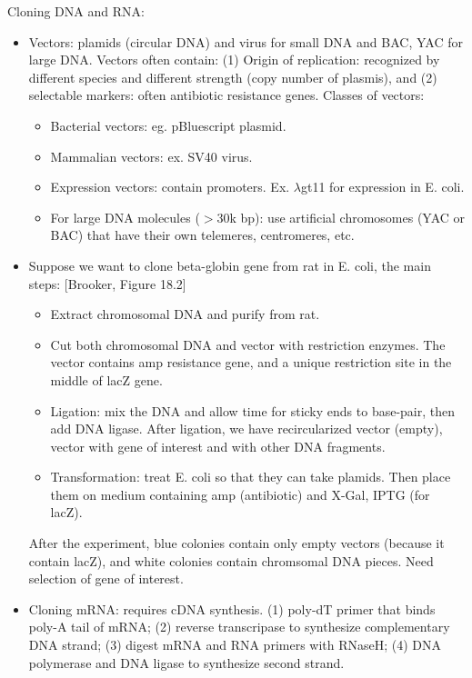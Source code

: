 \documentclass{report}
\begin{document}
Cloning DNA and RNA: 
\begin{itemize}
\item Vectors: plamids (circular DNA) and virus for small DNA and BAC, YAC for large DNA. Vectors often contain: (1) Origin of replication: recognized by different species and different strength (copy number of plasmis), and (2) selectable markers: often antibiotic resistance genes. Classes of vectors: 
\begin{itemize}
	\item Bacterial vectors: eg. pBluescript plasmid. 
	\item Mammalian vectors: ex. SV40 virus. 
	\item Expression vectors: contain promoters. Ex. $\lambda$gt11 for expression in E. coli.  
	\item For large DNA molecules ($>$30k bp): use artificial chromosomes (YAC or BAC) that have their own telemeres, centromeres, etc.
\end{itemize}
	
\item Suppose we want to clone beta-globin gene from rat in E. coli, the main steps: [Brooker, Figure 18.2]
\begin{itemize}
	\item Extract chromosomal DNA and purify from rat. 
	
	\item Cut both chromosomal DNA and vector with restriction enzymes. The vector contains amp resistance gene, and a unique restriction site in the middle of lacZ gene. 
	
	\item Ligation: mix the DNA and allow time for sticky ends to base-pair, then add DNA ligase. After ligation, we have recircularized vector (empty), vector with gene of interest and with other DNA fragments. 
	
	\item Transformation: treat E. coli so that they can take plamids. Then place them on medium containing amp (antibiotic) and X-Gal, IPTG (for lacZ). 
\end{itemize}	
After the experiment, blue colonies contain only empty vectors (because it contain lacZ), and white colonies contain chromsomal DNA pieces. Need selection of gene of interest. 

\item Cloning mRNA: requires cDNA synthesis. (1) poly-dT primer that binds poly-A tail of mRNA; (2) reverse transcripase to synthesize complementary DNA strand; (3) digest mRNA and RNA primers with RNaseH; (4) DNA polymerase and DNA ligase to synthesize second strand. 


\end{itemize}
\end{document}
